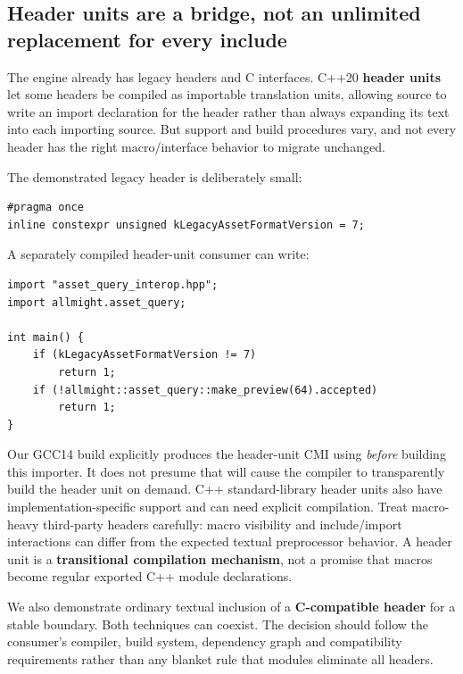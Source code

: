 \subsection{Header units are a bridge, not an unlimited replacement for every include}\label{05-engine-i-ch006-header-units-are-a-bridge-not-an-unlimited-replacement-for-every-include}

\hypertarget{05-engine-i-ch006-header-units-are-a-bridge-not-an-unlimited-replacement-for-every-include}{}

The engine already has legacy headers and C interfaces. C++20 \textbf{header units} let some headers be compiled as importable translation units, allowing source to write an import declaration for the header rather than always expanding its text into each importing source. But support and build procedures vary, and not every header has the right macro/interface behavior to migrate unchanged.

The demonstrated legacy header is deliberately small:

\begin{verbatim}
#pragma once
inline constexpr unsigned kLegacyAssetFormatVersion = 7;
\end{verbatim}

A separately compiled header-unit consumer can write:

\begin{verbatim}
import "asset_query_interop.hpp";
import allmight.asset_query;

int main() {
    if (kLegacyAssetFormatVersion != 7)
        return 1;
    if (!allmight::asset_query::make_preview(64).accepted)
        return 1;
}
\end{verbatim}

Our GCC14 build explicitly produces the header-unit CMI using  \emph{before} building this importer. It does not presume that  will cause the compiler to transparently build the header unit on demand. C++ standard-library header units also have implementation-specific support and can need explicit compilation. Treat macro-heavy third-party headers carefully: macro visibility and include/import interactions can differ from the expected textual preprocessor behavior. A header unit is a \textbf{transitional compilation mechanism}, not a promise that macros become regular exported C++ module declarations.

We also demonstrate ordinary textual inclusion of a \textbf{C-compatible header} for a stable boundary. Both techniques can coexist. The decision should follow the consumer's compiler, build system, dependency graph and compatibility requirements rather than any blanket rule that modules eliminate all headers.

